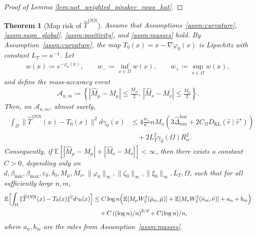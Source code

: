 \documentclass[11pt,reqno]{amsart}
\newtheorem{theorem}{Theorem}
\theoremstyle{definition}
\newcommand{\KL}{\mathrm{KL}}
\renewcommand{\hat}{\widehat}
\newcommand{\Ep}{\mathbb{E}}
\renewcommand{\epsilon}{\varepsilon}
\begin{document}
\begin{proof}[Proof of Lemma \ref{lem:uot_weighted_pinsker_rows_hat}]
\end{proof}


\begin{theorem}[Map risk of $\hat T^{1\mathrm{NN}}$]
\label{thm:uot_complete_1nn_estimated_mass}
Assume that Assumptions~\ref{assm:curvature}, \ref{assm:supp_global}, \ref{assm:positivity}, and \ref{assm:masses} hold.
By Assumption~\ref{assm:curvature}, the map $T_0(x) = x - \nabla \varphi_0(x)$ is Lipschitz with constant $L_T \coloneqq \kappa^{-1}$.
Let
\begin{align}
    w(x)\coloneqq e^{-\varphi_0(x)},
    \qquad
    w_- \coloneqq \inf_{x\in\Omega} w(x),
    \qquad
    w_+ \coloneqq \sup_{x\in\Omega} w(x),
\end{align}
and define the mass-accuracy event
\begin{align}
    \mathcal{A}_{n,m}
    \coloneqq
    \left\{
        |\hat M_\mu-M_\mu|\le \frac{M_\mu}{2},
        \ |\hat M_\nu-M_\nu|\le \frac{M_\nu}{2}
    \right\}.
\end{align}
Then, on $\mathcal{A}_{n,m}$, almost surely,
\begin{align}
\label{eq:uot_complete_1nn_estimated_mass_as}
\begin{aligned}
    \int_\Omega \|\hat T^{\mathrm{1NN}}(x)-T_0(x)\|^2  d\gamma_0(x)
    &\le
    4\frac{w_+}{w_-}  n M_n
    \left(
        3\hat\Delta_{nm}^{\mathrm{bar}}
        + 2C_\Omega {D_\KL}(\hat r\mid \hat r^\star)
    \right) \\
    &\quad + 2L_T^2\gamma_0(\Omega)R_n^2.
\end{aligned}
\end{align}
Consequently, if
\(
\Ep[|\hat M_\mu-M_\mu|+|\hat M_\nu-M_\nu|]<\infty
\),
then there exists a constant $C>0$, depending only on
\(
d,\beta_{\min},\beta_{\max},\epsilon_0,\delta_0,M_\mu,M_\nu,\|\varphi_0\|_\infty,\|\zeta_0\|_\infty,\|\xi_0\|_\infty,L_T,\Omega
\),
such that for all sufficiently large $n,m$,
\begin{align}
\label{eq:uot_complete_1nn_estimated_mass_expectation}
\begin{aligned}
    \Ep\Bigl[
        \int_\Omega \|\hat T^{\mathrm{1NN}}(x)-T_0(x)\|^2  d\gamma_0(x)
    \Bigr]
    &\le
    C \log n
    \Bigl(
        \Ep[M_\mu W_2^2(\bar\mu_n,\bar\mu)]
        +
        \Ep[M_\nu W_2^2(\bar\nu_m,\bar\nu)]
        + a_n + b_m
    \Bigr) \\
    &\quad
    + C\left({(\log n)/n}\right)^{2/d}
    + C{(\log n)/n},
\end{aligned}
\end{align}
where $a_n,b_m$ are the rates from Assumption~\ref{assm:masses}.
\end{theorem}
\end{document}
